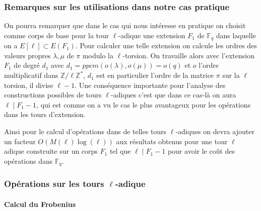 \documentclass[10pt,a4paper]{book}
\theoremstyle{plain}
\theoremstyle{definition}
\theoremstyle{definition}
\theoremstyle{definition}
\theoremstyle{definition}
\theoremstyle{remark}
\theoremstyle{remark}
\theoremstyle{definition}
\begin{document}
\subsubsection{Remarques sur les utilisations dans notre cas pratique}
On pourra remarquer que dans le cas qui nous intéresse en pratique on choisit comme corps de base pour la tour $\ell$-adique une extension $F_1$ de $\mathbb{F}_q$ dans laquelle on a $E[\ell] \subset E(F_1)$. Pour calculer une telle extension on calcule les ordres des valeurs propres $\lambda, \mu$ de $\pi$ modulo la $\ell$-torsion. On travaille alors avec l'extension $F_1$ de degré $d_1$ avec $d_1=ppcm(o(\lambda),o(\mu))=o(q)$ et $o$ l'ordre multiplicatif dans $\mathbb{Z}/\ell\mathbb{Z}^*$, $d_1$ est en particulier l'ordre de la matrice $\pi$ sur la $\ell$ torsion, il divise $\ell-1$. Une conséquence importante pour l'analyse des constructions possibles de tours $\ell$-adiques c'est que dans ce cas-là on aura $\ell \mid F_1-1$, qui est comme on a vu le cas le plus avantageux pour les opérations dans les tours d'extension. 

Ainsi pour le calcul d'opérations dans de telles tours $\ell$-adiques on devra ajouter un facteur $O(M(\ell)\log(\ell))$ aux résultats obtenus pour une tour $\ell$ adique construite sur un corps $F_1$ tel que $\ell \mid F_1-1$ pour avoir le coût des opérations dans $\mathbb{F}_q$.


\subsubsection{Opérations sur les tours $\ell$-adique}


\paragraph{Calcul du Frobenius}








\end{document}
